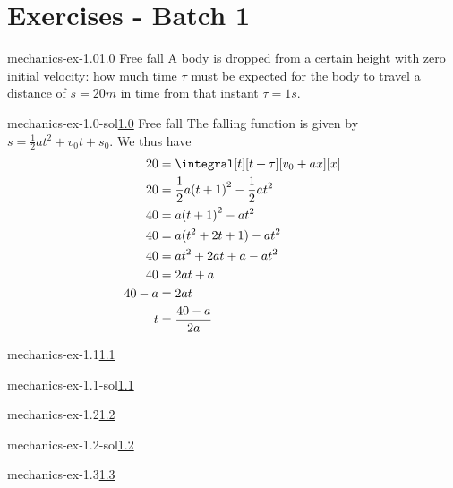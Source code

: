 \documentclass[preview]{standalone}
\begin{document}
\genpage

\section{Exercises - Batch 1}

\begin{snippetexercise}{mechanics-ex-1.0}{\underline{1.0} Free fall}
    A body is dropped from a certain height with zero initial velocity: how much time
    \(\tau\) must be expected for the body to travel a distance of \(s = 20m\) in time from that instant
    \(\tau = 1s\).
\end{snippetexercise}

\begin{snippetsolution}{mechanics-ex-1.0-sol}{\underline{1.0} Free fall}
    The falling function is given by \(s = \frac{1}{2}at^2 + v_0t + s_0\).
    We thus have
    \begin{align*}
        20 &= \integral[t][t+\tau][v_0 + ax][x] \\
        20 &= \frac{1}{2}a{(t+1)}^2 - \frac{1}{2}at^2 \\
        40 &= a{(t+1)}^2 - at^2 \\
        40 &= a(t^2 + 2t + 1) - at^2 \\
        40 &= at^2 + 2at + a - at^2 \\
        40 &= 2at + a \\
        40 - a &= 2at \\
        t &= \frac{40 - a}{2a}
    \end{align*}
\end{snippetsolution}

\begin{snippetexercise}{mechanics-ex-1.1}{\underline{1.1}}
    \todo
\end{snippetexercise}

\begin{snippetsolution}{mechanics-ex-1.1-sol}{\underline{1.1}}
    \todo
\end{snippetsolution}

\begin{snippetexercise}{mechanics-ex-1.2}{\underline{1.2}}
    \todo
\end{snippetexercise}

\begin{snippetsolution}{mechanics-ex-1.2-sol}{\underline{1.2}}
    \todo
\end{snippetsolution}

\begin{snippetexercise}{mechanics-ex-1.3}{\underline{1.3}}
    \todo
\end{snippetexercise}
\end{document}
